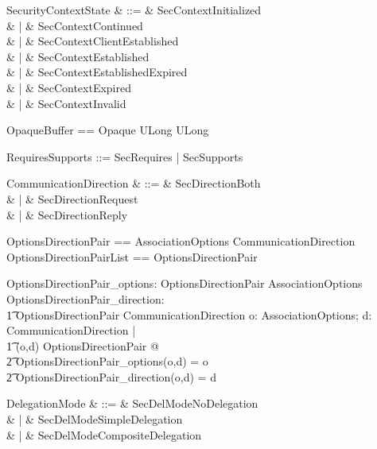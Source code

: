 \begin{syntax}
  SecurityContextState & ::= & SecContextInitialized \\
  & | & SecContextContinued \\
  & | & SecContextClientEstablished \\
  & | & SecContextEstablished \\
  & | & SecContextEstablishedExpired \\
  & | & SecContextExpired \\
  & | & SecContextInvalid
\end{syntax}
\begin{zed}
  OpaqueBuffer == Opaque \cross ULong \cross ULong \\
\end{zed}
\begin{zed}
   RequiresSupports ::= SecRequires | SecSupports
\end{zed}
\begin{syntax}
   CommunicationDirection & ::= & SecDirectionBoth\\
  & | & SecDirectionRequest\\
  & | & SecDirectionReply
\end{syntax}
 
\begin{zed}
  OptionsDirectionPair == AssociationOptions \cross CommunicationDirection \\
  OptionsDirectionPairList == \seq OptionsDirectionPair
\end{zed}
\begin{axdef}
  OptionsDirectionPair\_options: OptionsDirectionPair \fun AssociationOptions\\
  OptionsDirectionPair\_direction: \\
  \t1 OptionsDirectionPair \fun CommunicationDirection
  \where
  \forall o: AssociationOptions; d: CommunicationDirection | \\
  \t1 (o,d) \in OptionsDirectionPair @ \\
  \t2 OptionsDirectionPair\_options(o,d) = o \\
  \t2 \land OptionsDirectionPair\_direction(o,d) = d
\end{axdef}
\begin{syntax}
   DelegationMode & ::= & SecDelModeNoDelegation\\
  & | & SecDelModeSimpleDelegation\\
  & | & SecDelModeCompositeDelegation
\end{syntax}
